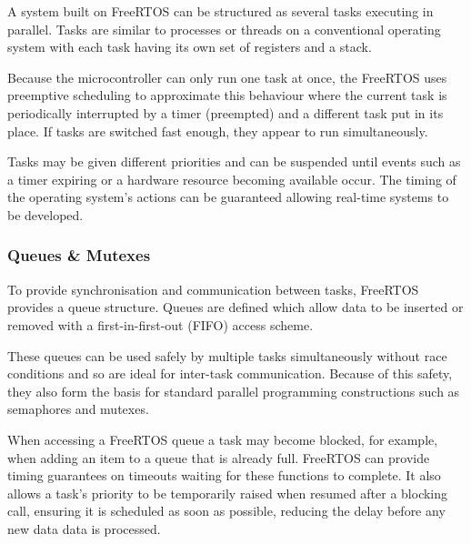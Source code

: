 				A system built on FreeRTOS can be structured as several tasks
				executing in parallel. Tasks are similar to processes or threads on a
				conventional operating system with each task having its own set of
				registers and a stack.
				
				Because the microcontroller can only run one task at once, the FreeRTOS
				uses preemptive scheduling to approximate this behaviour where the
				current task is periodically interrupted by a timer (preempted) and a
				different task put in its place. If tasks are switched fast enough, they
				appear to run simultaneously.
				
				Tasks may be given different priorities and can be suspended until
				events such as a timer expiring or a hardware resource becoming
				available occur. The timing of the operating system's actions can be
				guaranteed allowing real-time systems to be developed.
				
			\subsubsection{Queues \& Mutexes}
				
				To provide synchronisation and communication between tasks, FreeRTOS
				provides a queue structure. Queues are defined which allow data to be
				inserted or removed with a first-in-first-out (FIFO) access scheme.
				
				These queues can be used safely by multiple tasks simultaneously without
				race conditions and so are ideal for inter-task communication.  Because
				of this safety, they also form the basis for standard parallel
				programming constructions such as semaphores and mutexes.
				
				When accessing a FreeRTOS queue a task may become blocked, for example,
				when adding an item to a queue that is already full. FreeRTOS can
				provide timing guarantees on timeouts waiting for these functions to
				complete. It also allows a task's priority to be temporarily raised when
				resumed after a blocking call, ensuring it is scheduled as soon as
				possible, reducing the delay before any new data data is processed.
